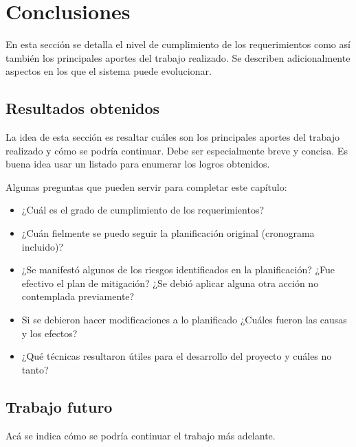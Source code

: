 
\chapter{Conclusiones} %

\label{Chapter5} %

En esta sección se detalla el nivel de cumplimiento de los requerimientos como así también los principales aportes del trabajo realizado. Se describen adicionalmente aspectos en los que el sistema puede evolucionar.



\section{Resultados obtenidos}

La idea de esta sección es resaltar cuáles son los principales aportes del trabajo realizado y cómo se podría continuar. Debe ser especialmente breve y concisa. Es buena idea usar un listado para enumerar los logros obtenidos.

Algunas preguntas que pueden servir para completar este capítulo:

\begin{itemize}
\item ¿Cuál es el grado de cumplimiento de los requerimientos?
\item ¿Cuán fielmente se puedo seguir la planificación original (cronograma incluido)?
\item ¿Se manifestó algunos de los riesgos identificados en la planificación? ¿Fue efectivo el plan de mitigación? ¿Se debió aplicar alguna otra acción no contemplada previamente?
\item Si se debieron hacer modificaciones a lo planificado ¿Cuáles fueron las causas y los efectos?
\item ¿Qué técnicas resultaron útiles para el desarrollo del proyecto y cuáles no tanto?
\end{itemize}


\section{Trabajo futuro}

Acá se indica cómo se podría continuar el trabajo más adelante.
